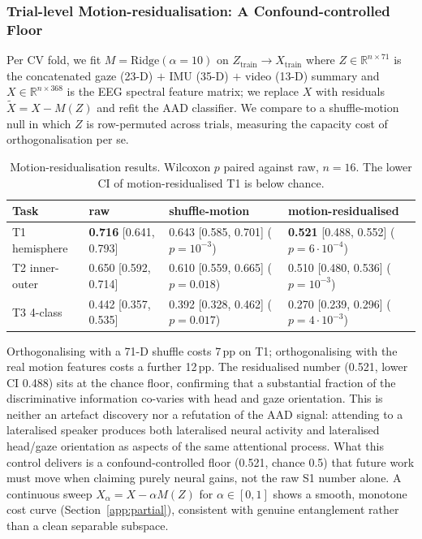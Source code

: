 \documentclass{article}
\begin{document}
\subsubsection{Trial-level Motion-residualisation: A Confound-controlled Floor}
\label{app:resid}

Per CV fold, we fit $M = \text{Ridge}(\alpha{=}10)$ on $Z_\text{train} \to
X_\text{train}$ where $Z \in \mathbb{R}^{n \times 71}$ is the concatenated
gaze (23-D) $+$ IMU (35-D) $+$ video (13-D) summary and $X \in
\mathbb{R}^{n \times 368}$ is the EEG spectral feature matrix; we replace
$X$ with residuals $\tilde{X} = X - M(Z)$ and refit the AAD classifier. We
compare to a shuffle-motion null in which $Z$ is row-permuted across
trials, measuring the capacity cost of orthogonalisation per se.

\begin{table}[ht]
\centering
\small
\caption{Motion-residualisation results. Wilcoxon $p$ paired against raw,
$n{=}16$. The lower CI of motion-residualised T1 is below chance.}
\label{tab:resid}
\begin{tabular}{llll}
\toprule
Task & raw & shuffle-motion & motion-residualised \\
\midrule
T1 hemisphere  & \textbf{0.716} [0.641, 0.793] & 0.643 [0.585, 0.701] ($p{=}10^{-3}$)      & \textbf{0.521} [0.488, 0.552] ($p{=}6{\cdot}10^{-4}$) \\
T2 inner-outer & 0.650 [0.592, 0.714]          & 0.610 [0.559, 0.665] ($p{=}0.018$)         & 0.510 [0.480, 0.536] ($p{=}10^{-3}$) \\
T3 4-class     & 0.442 [0.357, 0.535]          & 0.392 [0.328, 0.462] ($p{=}0.017$)         & 0.270 [0.239, 0.296] ($p{=}4{\cdot}10^{-3}$) \\
\bottomrule
\end{tabular}
\end{table}

Orthogonalising with a 71-D shuffle costs 7\,pp on T1; orthogonalising with
the real motion features costs a further 12\,pp. The residualised number
(0.521, lower CI 0.488) sits at the chance floor, confirming that a
substantial fraction of the discriminative information co-varies with head
and gaze orientation. This is neither an artefact discovery nor a refutation
of the AAD signal: attending to a lateralised speaker produces both
lateralised neural activity and lateralised head/gaze orientation as aspects
of the same attentional process. What this control delivers is a
confound-controlled floor (0.521, chance 0.5) that future work must move
when claiming purely neural gains, not the raw S1 number alone. A continuous
sweep $X_\alpha = X - \alpha M(Z)$ for $\alpha \in [0,1]$ shows a smooth,
monotone cost curve (Section~\ref{app:partial}), consistent with genuine
entanglement rather than a clean separable subspace.
\end{document}
